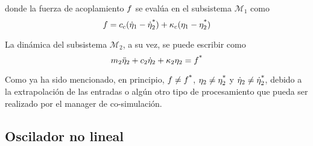 donde la fuerza de acoplamiento $f$ se evalúa en el subsistema $\mathcal{M}_1$ como
%
\begin{equation}
	f = c_c (\dot{\eta}_1 - \dot{\eta}_2^{\textrm *}) + \kappa_c (\eta_1 - \eta_2^{\textrm *})
\end{equation}

La dinámica del subsistema $\mathcal{M}_2$, a su vez, se puede escribir como
%
\begin{equation}
    m_2 \ddot{\eta}_2 + c_2 \dot{\eta}_2 + \kappa_2 \eta_2 = f^{\textrm *}
\end{equation}

Como ya ha sido mencionado, en principio, $f \neq f^{\textrm *}$, $\eta_2 \neq \eta_2^{\textrm *}$ y $\dot{\eta}_2 \neq \dot{\eta}_2^{\textrm *}$, debido a la extrapolación de las entradas o algún otro tipo de procesamiento que pueda ser realizado por el manager de co-simulación.

\subsection{Oscilador no lineal}
\label{sec:osciladorNL}

